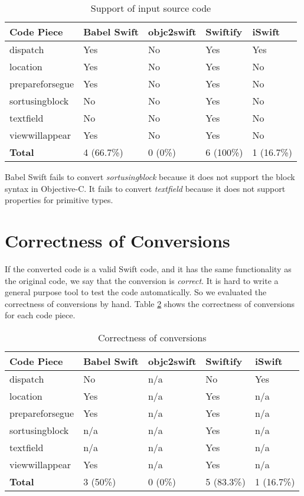 \documentclass{sfuthesis}
\begin{document}
\begin{table}[H]
\begin{center}
\caption{Support of input source code}
\label{table:numcodesupported}
\begin{tabular}{|l|l|l|l|l|}
\hline
\textbf{Code Piece} & Babel Swift & objc2swift & Swiftify & iSwift \\
\hline
dispatch        & Yes & No  & Yes & Yes \\
location        & Yes & No  & Yes & No  \\
prepareforsegue & Yes & No  & Yes & No  \\
sortusingblock  & No  & No  & Yes & No  \\
textfield       & No  & No  & Yes & No  \\
viewwillappear  & Yes & No  & Yes & No  \\
\hline
\textbf{Total}  & 4 (66.7\%) & 0 (0\%) & 6 (100\%) & 1 (16.7\%) \\
\hline
\end{tabular}
\end{center}
\end{table}

Babel Swift fails to convert \emph{sortusingblock} because it does not support the block syntax \cite{objcblock} in Objective-C. It fails to convert \emph{textfield} because it does not support properties for primitive types.

\section{Correctness of Conversions}

If the converted code is a valid Swift code, and it has the same functionality as the original code, we say that the conversion is \emph{correct}. It is hard to write a general purpose tool to test the code automatically. So we evaluated the correctness of conversions by hand. Table \ref{table:correctness} shows the correctness of conversions for each code piece.

\begin{table}[H]
\begin{center}
\caption{Correctness of conversions}
\label{table:correctness}
\begin{tabular}{|l|l|l|l|l|}
\hline
\textbf{Code Piece} & Babel Swift & objc2swift & Swiftify & iSwift \\
\hline
dispatch        & No  & n/a & No  & Yes \\
location        & Yes & n/a & Yes & n/a \\
prepareforsegue & Yes & n/a & Yes & n/a \\
sortusingblock  & n/a & n/a & Yes & n/a \\
textfield       & n/a & n/a & Yes & n/a \\
viewwillappear  & Yes & n/a & Yes & n/a \\
\hline
\textbf{Total}  & 3 (50\%) & 0 (0\%) & 5 (83.3\%) & 1 (16.7\%) \\
\hline
\end{tabular}
\end{center}
\end{table}
\end{document}
